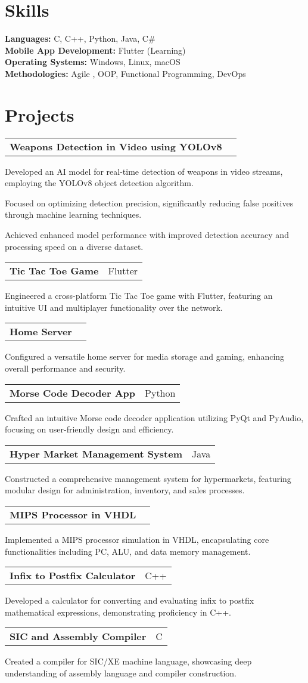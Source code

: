 \documentclass[letterpaper,11pt]{article}
\makeatletter
\newcommand{\resumeItem}[1]{\item\small{{#1 \vspace{-2pt}}}}
\newcommand{\resumeProjectHeading}[2]{\vspace{-2pt}\item
    \begin{tabular*}{0.97\textwidth}{l@{\extracolsep{\fill}}r}
      \small#1 & #2 \\
    \end{tabular*}\vspace{-7pt}
}
\makeatother
\begin{document}
\section{Skills}
\resumeSubHeadingListStart
    \small{\item{
        \textbf{Languages:} C, C++, Python, Java, C\# \\
        \textbf{Mobile App Development:} Flutter (Learning)\\
        \textbf{Operating Systems:} Windows, Linux, macOS \\
        \textbf{Methodologies:}{ Agile , OOP, Functional Programming, DevOps} \vspace{3pt}
}
\resumeSubHeadingListEnd

\section{Projects}
\resumeSubHeadingListStart
    \resumeProjectHeading
          {\textbf{Weapons Detection in Video using YOLOv8}}{}
          \resumeItemListStart
              \resumeItem{Developed an AI model for real-time detection of weapons in video streams, employing the YOLOv8 object detection algorithm.}
              \resumeItem{Focused on optimizing detection precision, significantly reducing false positives through machine learning techniques.}
              \resumeItem{Achieved enhanced model performance with improved detection accuracy and processing speed on a diverse dataset.}
          \resumeItemListEnd
    \resumeProjectHeading
          {\textbf{Tic Tac Toe Game}}{Flutter}
          \resumeItem{Engineered a cross-platform Tic Tac Toe game with Flutter, featuring an intuitive UI and multiplayer functionality over the network.}
    \resumeProjectHeading
          {\textbf{Home Server}}{}
          \resumeItem{Configured a versatile home server for media storage and gaming, enhancing overall performance and security.}
    \resumeProjectHeading
          {\textbf{Morse Code Decoder App}}{Python}
          \resumeItem{Crafted an intuitive Morse code decoder application utilizing PyQt and PyAudio, focusing on user-friendly design and efficiency.}
    \resumeProjectHeading
          {\textbf{Hyper Market Management System}}{Java}
          \resumeItem{Constructed a comprehensive management system for hypermarkets, featuring modular design for administration, inventory, and sales processes.}
    \resumeProjectHeading
          {\textbf{MIPS Processor in VHDL}}{}
          \resumeItem{Implemented a MIPS processor simulation in VHDL, encapsulating core functionalities including PC, ALU, and data memory management.}
    \resumeProjectHeading
          {\textbf{Infix to Postfix Calculator}}{C++}
          \resumeItem{Developed a calculator for converting and evaluating infix to postfix mathematical expressions, demonstrating proficiency in C++.}
    \resumeProjectHeading
          {\textbf{SIC and Assembly Compiler}}{C}
          \resumeItem{Created a compiler for SIC/XE machine language, showcasing deep understanding of assembly language and compiler construction.}
\resumeSubHeadingListEnd


}
\end{document}
